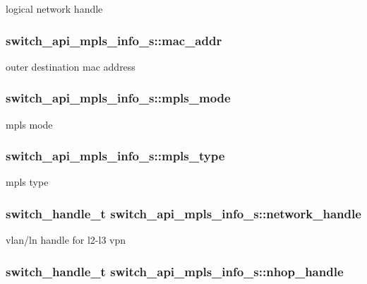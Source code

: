 logical network handle \hypertarget{group__Tunnel_ga62f1b9c744e029bab8e5688751f3f347}{
\subsubsection[{mac\+\_\+addr}]{ switch\+\_\+api\+\_\+mpls\+\_\+info\+\_\+s\+::mac\+\_\+addr}}\label{group__Tunnel_ga62f1b9c744e029bab8e5688751f3f347}
outer destination mac address \hypertarget{group__Tunnel_ga74f8a7c6cdb442d448911935d40a43a0}{
\subsubsection[{mpls\+\_\+mode}]{ switch\+\_\+api\+\_\+mpls\+\_\+info\+\_\+s\+::mpls\+\_\+mode}}\label{group__Tunnel_ga74f8a7c6cdb442d448911935d40a43a0}
mpls mode \hypertarget{group__Tunnel_gaaba85ce3e34b028c217449796c83d6f0}{
\subsubsection[{mpls\+\_\+type}]{ switch\+\_\+api\+\_\+mpls\+\_\+info\+\_\+s\+::mpls\+\_\+type}}\label{group__Tunnel_gaaba85ce3e34b028c217449796c83d6f0}
mpls type \hypertarget{group__Tunnel_gac651442108f51cc85587aafe8d7838a9}{
\subsubsection[{network\+\_\+handle}]{\setlength{\rightskip}{0pt plus 5cm}switch\+\_\+handle\+\_\+t switch\+\_\+api\+\_\+mpls\+\_\+info\+\_\+s\+::network\+\_\+handle}}\label{group__Tunnel_gac651442108f51cc85587aafe8d7838a9}
vlan/ln handle for l2-\/l3 vpn \hypertarget{group__Tunnel_ga78469526e456f991248a2cd545be8008}{
\subsubsection[{nhop\+\_\+handle}]{\setlength{\rightskip}{0pt plus 5cm}switch\+\_\+handle\+\_\+t switch\+\_\+api\+\_\+mpls\+\_\+info\+\_\+s\+::nhop\+\_\+handle}}\label{group__Tunnel_ga78469526e456f991248a2cd545be8008}
